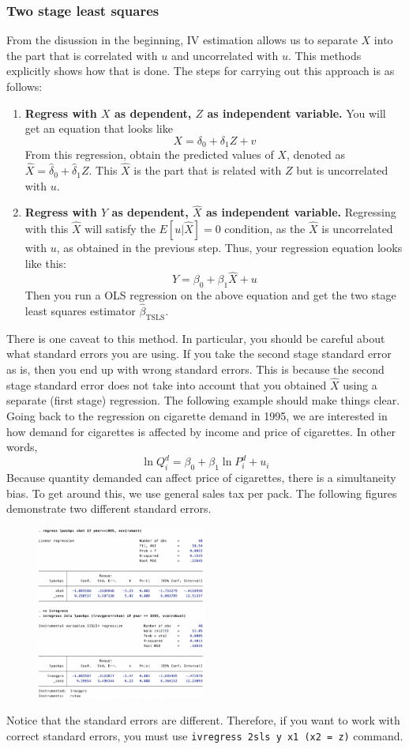 \documentclass[12pt]{article}
\theoremstyle{definition}
\theoremstyle{property}
\theoremstyle{assumption}
\theoremstyle{example}
\theoremstyle{comment}
\begin{document}
\subsubsection{Two stage least squares} %
From the disussion in the beginning, IV estimation allows us to separate $X$ into the part that is correlated with $u$ and uncorrelated with $u$. This methods explicitly shows how that is done. The steps for carrying out this approach is as follows:
\begin{enumerate}
\item \textbf{Regress with $X$ as dependent, $Z$ as independent variable.} You will get an equation that looks like
\[
X=\delta_0 + \delta_1Z+v
\]
From this regression, obtain the predicted values of $X$, denoted as $\hat{X}=\hat{\delta}_0+\hat{\delta}_1Z$. This $\hat{X}$ is the part that is related with $Z$ but is uncorrelated with $u$.
\item \textbf{Regress with $Y$ as dependent, $\hat{X}$ as independent variable.} Regressing with this $\hat{X}$ will satisfy the $E[u|\hat{X}]=0$ condition, as the $\hat{X}$ is uncorrelated with $u$, as obtained in the previous step. Thus, your regression equation looks like this:
\[
Y=\beta_0+\beta_1\hat{X}+u
\]
Then you run a OLS regression on the above equation and get the two stage least squares estimator $\hat{\beta}_{\text{TSLS}}$. 
\end{enumerate} \par\medskip
There is one caveat to this method. In particular, you should be careful about what standard errors you are using. If you take the second stage standard error as is, then you end up with wrong standard errors. This is because the second stage standard error does not take into account that you obtained $\hat{X}$ using a separate (first stage) regression. The following example should make things clear. Going back to the regression on cigarette demand in 1995, we are interested in how demand for cigarettes is affected by income and price of cigarettes. In other words,
\[
\ln{Q_i^d}=\beta_0+\beta_1\ln{P_i^d}+u_i
\]
Because quantity demanded can affect price of cigarettes, there is a simultaneity bias. To get around this, we use general sales tax per pack. The following figures demonstrate two different standard errors.
\begin{figure}[H]
\centering
\includegraphics[width=0.5\textwidth,keepaspectratio]{ivregress.png}
\end{figure}
Notice that the standard errors are different. Therefore, if you want to work with correct standard errors, you must use \texttt{ivregress 2sls y x1 (x2 = z)} command.
\end{document}
